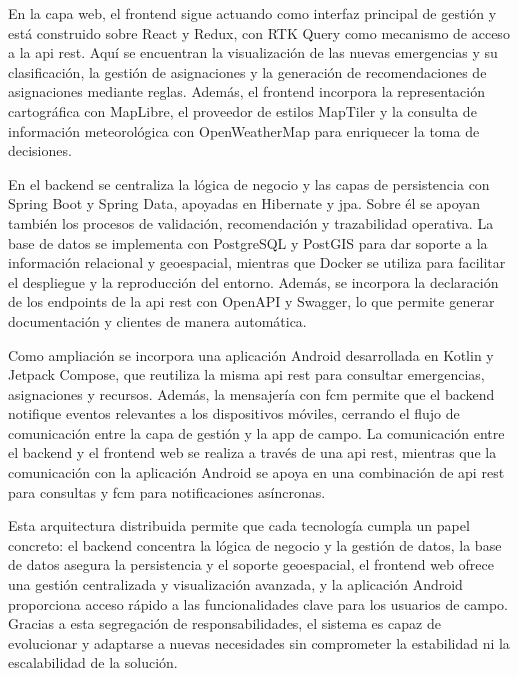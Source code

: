 En la capa web, el frontend sigue actuando como interfaz principal de gestión y está construido sobre React y Redux, con RTK Query como mecanismo de acceso a la \acrshort{api} \acrshort{rest}. Aquí se encuentran la visualización de las nuevas emergencias y su clasificación, la gestión de asignaciones y la generación de recomendaciones de asignaciones mediante reglas. Además, el frontend incorpora la representación cartográfica con MapLibre, el proveedor de estilos MapTiler y la consulta de información meteorológica con OpenWeatherMap para enriquecer la toma de decisiones.

En el backend se centraliza la lógica de negocio y las capas de persistencia con Spring Boot y Spring Data, apoyadas en Hibernate y \acrfull{jpa}. Sobre él se apoyan también los procesos de validación, recomendación y trazabilidad operativa. La base de datos se implementa con PostgreSQL y PostGIS para dar soporte a la información relacional y geoespacial, mientras que Docker se utiliza para facilitar el despliegue y la reproducción del entorno. Además, se incorpora la declaración de los endpoints de la \acrshort{api} \acrshort{rest} con OpenAPI y Swagger, lo que permite generar documentación y clientes de manera automática.

Como ampliación se incorpora una aplicación Android desarrollada en Kotlin y Jetpack Compose, que reutiliza la misma \acrshort{api} \acrshort{rest} para consultar emergencias, asignaciones y recursos. Además, la mensajería con \acrfull{fcm} permite que el backend notifique eventos relevantes a los dispositivos móviles, cerrando el flujo de comunicación entre la capa de gestión y la app de campo. La comunicación entre el backend y el frontend web se realiza a través de una \acrshort{api} \acrshort{rest}, mientras que la comunicación con la aplicación Android se apoya en una combinación de \acrshort{api} \acrshort{rest} para consultas y \acrshort{fcm} para notificaciones asíncronas.

Esta arquitectura distribuida permite que cada tecnología cumpla un papel concreto: el backend concentra la lógica de negocio y la gestión de datos, la base de datos asegura la persistencia y el soporte geoespacial, el frontend web ofrece una gestión centralizada y visualización avanzada, y la aplicación Android proporciona acceso rápido a las funcionalidades clave para los usuarios de campo. Gracias a esta segregación de responsabilidades, el sistema es capaz de evolucionar y adaptarse a nuevas necesidades sin comprometer la estabilidad ni la escalabilidad de la solución.


